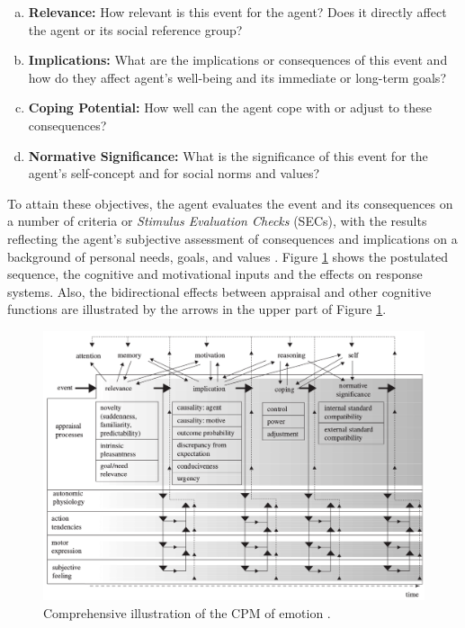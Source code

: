 \documentclass[11pt]{article}
\begin{document}
\begin{enumerate}[a)]
  \item \textbf{Relevance:} How relevant is this event for the agent? Does it
  directly affect the agent or its social reference group?
  \item \textbf{Implications:} What are the implications or consequences of this
  event and how do they affect agent's well-being and its immediate or long-term
  goals?
  \item \textbf{Coping Potential:} How well can the agent cope with or adjust to
  these consequences?
  \item \textbf{Normative Significance:} What is the significance of this event
  for the agent's self-concept and for social norms and values?
\end{enumerate}

To attain these objectives, the agent evaluates the event and its consequences
on a number of criteria or \textit{Stimulus Evaluation Checks} (SECs), with the
results reflecting the agent’s subjective assessment of consequences and
implications on a background of personal needs, goals, and values
\cite{scherer:appraisal-processes}. Figure \ref{fig:comp-cpm} shows the
postulated sequence, the cognitive and motivational inputs and the effects on
response systems. Also, the bidirectional effects between appraisal and other
cognitive functions are illustrated by the arrows in the upper part of Figure
\ref{fig:comp-cpm}.

\begin{figure}[tbh]
  \center
  \includegraphics[width=\textwidth]{figure/comprehensive-CPM.png}
  \caption{Comprehensive illustration of the CPM of emotion
  \cite{scherer:dynamic-architecture-emotion,scherer:appraisal-processes}.}
  \label{fig:comp-cpm}
\end{figure}
\end{document}
